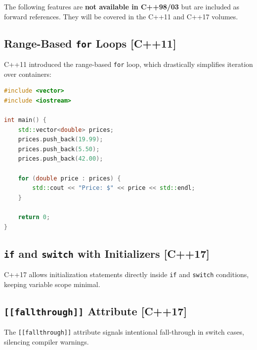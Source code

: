 The following features are \textbf{not available in C++98/03} but are included as forward references. They will be covered in the C++11 and C++17 volumes.

\subsection{Range-Based \texttt{for} Loops [C++11]}

C++11 introduced the range-based \texttt{for} loop, which drastically simplifies iteration over containers:

\begin{lstlisting}[language=C++, caption={Range-based for loop [C++11]}]
#include <vector>
#include <iostream>

int main() {
    std::vector<double> prices;
    prices.push_back(19.99);
    prices.push_back(5.50);
    prices.push_back(42.00);

    for (double price : prices) {
        std::cout << "Price: $" << price << std::endl;
    }

    return 0;
}
\end{lstlisting}

\subsection{\texttt{if} and \texttt{switch} with Initializers [C++17]}

C++17 allows initialization statements directly inside \texttt{if} and \texttt{switch} conditions, keeping variable scope minimal.

\subsection{\texttt{[[fallthrough]]} Attribute [C++17]}

The \texttt{[[fallthrough]]} attribute signals intentional fall-through in switch cases, silencing compiler warnings.
